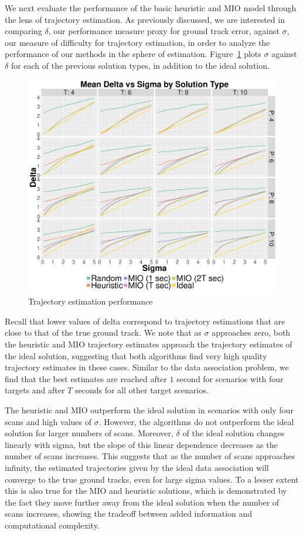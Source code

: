We next evaluate the performance of the basic heuristic and MIO model through the lens of trajectory estimation. As previously discussed, we are interested in comparing $\delta$, our performance measure proxy for ground track error, against $\sigma$, our measure of difficulty for trajectory estimation, in order to analyze the performance of our methods in the sphere of estimation. Figure~\ref{Fig:Basic_Delta_Summary} plots $\sigma$ against $\delta$ for each of the previous solution types, in addition to the ideal solution. 
\begin{figure}[ht]
  \centering
  \includegraphics[width=\columnwidth]{../Figures/Basic_Delta_Summary}
  \caption{Trajectory estimation performance}
  \label{Fig:Basic_Delta_Summary}
\end{figure}

Recall that lower values of delta correspond to trajectory estimations that are close to that of the true ground track. We note that as $\sigma$ approaches zero, both the heuristic and MIO trajectory estimates approach the trajectory estimates of the ideal solution, suggesting that both algorithms find very high quality trajectory estimates in these cases. Similar to the data association problem, we find that the best estimates are reached after $1$ second for scenarios with four targets and after $T$ seconds for all other target scenarios.

The heuristic and MIO outperform the ideal solution in scenarios with only four scans and high values of $\sigma$. However, the algorithms do not outperform the ideal solution for larger numbers of scans. Moreover, $\delta$ of the ideal solution changes linearly with sigma, but the slope of this linear dependence decreases as the number of scans increases. This suggests that as the number of scans approaches infinity, the estimated trajectories given by the ideal data association will converge to the true ground tracks, even for large sigma values. To a lesser extent this is also true for the MIO and heuristic solutions, which is demonstrated by the fact they move further away from the ideal solution when the number of scans increases, showing the tradeoff between added information and computational complexity.

